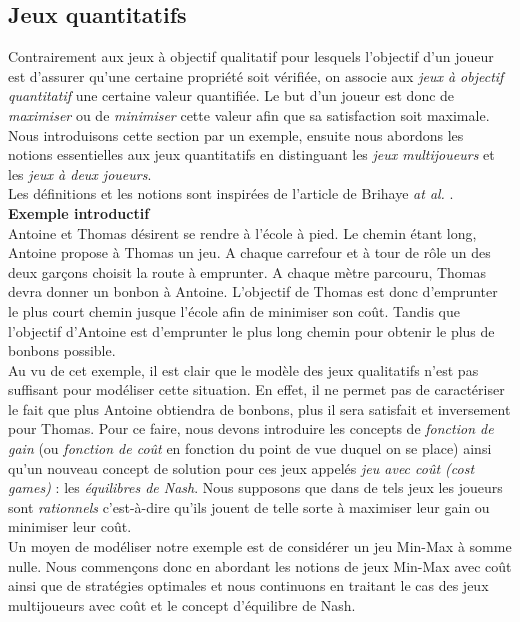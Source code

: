 
\subsection{Jeux quantitatifs }

Contrairement aux jeux à objectif qualitatif pour lesquels l'objectif d'un joueur est d'assurer qu'une certaine propriété soit vérifiée, on associe aux \textit{jeux à objectif quantitatif} une certaine valeur quantifiée. Le but d'un joueur est donc de \textit{maximiser} ou de \textit{minimiser} cette valeur afin que sa satisfaction soit maximale.\\

Nous introduisons cette section par un exemple, ensuite nous abordons les notions essentielles aux jeux quantitatifs en distinguant les \textit{jeux multijoueurs} et les \textit{jeux à deux joueurs}.\\
Les définitions et les notions sont inspirées de l'article de Brihaye \emph{at al.} \cite{DBLP:conf/lfcs/BrihayePS13}.\\

\noindent\textbf {Exemple introductif} \\
\indent Antoine et Thomas désirent se rendre à l'école à pied. Le chemin étant long, Antoine propose à Thomas un jeu. A chaque carrefour et à tour de rôle un des deux garçons choisit la route à emprunter. A chaque mètre parcouru, Thomas devra donner un bonbon à Antoine. L'objectif de Thomas est donc d'emprunter le plus court chemin jusque l'école afin de minimiser son coût. Tandis que l'objectif d'Antoine est d'emprunter le plus long chemin pour obtenir le plus de bonbons possible.\\

Au vu de cet exemple, il est clair que le modèle des jeux qualitatifs n'est pas suffisant pour modéliser cette situation. En effet, il ne permet pas de caractériser le fait que plus Antoine obtiendra de bonbons, plus il sera satisfait et inversement pour Thomas. Pour ce faire, nous devons introduire les concepts de \textit{fonction de gain} (ou \textit{fonction de coût} en fonction du point de vue duquel on se place) ainsi qu'un nouveau concept de solution pour ces jeux appelés \textit{jeu avec coût (cost games)} : les \textit{équilibres de Nash}. Nous supposons que dans de tels jeux les joueurs sont \textit{rationnels} c'est-à-dire qu'ils jouent de telle sorte à maximiser leur gain ou minimiser leur coût.\\

Un moyen de modéliser notre exemple est de considérer un jeu Min-Max à somme nulle. Nous commençons donc en abordant les notions de jeux Min-Max avec coût ainsi que de stratégies optimales et nous continuons en traitant le cas des jeux multijoueurs avec coût et le concept d'équilibre de Nash.\\






